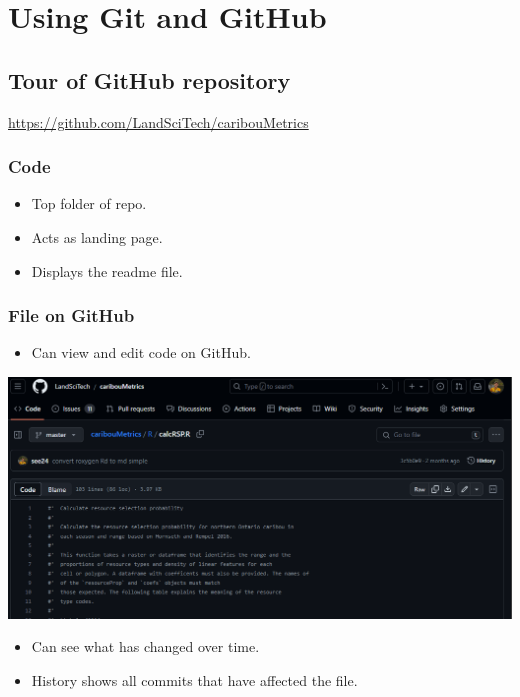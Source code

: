 \documentclass[
  letterpaper,
  DIV=11,
  numbers=noendperiod]{scrreprt}
\providecommand{\tightlist}{%
  \setlength{\itemsep}{0pt}\setlength{\parskip}{0pt}}\usepackage{longtable,booktabs,array}
\begin{document}
\hypertarget{using-git-and-github}{%
\chapter{Using Git and GitHub}\label{using-git-and-github}}

\hypertarget{tour-of-github-repository}{%
\section{Tour of GitHub repository}\label{tour-of-github-repository}}

\url{https://github.com/LandSciTech/caribouMetrics}

\hypertarget{code}{%
\subsection{Code}\label{code}}

\begin{itemize}
\tightlist
\item
  Top folder of repo.
\item
  Acts as landing page.
\item
  Displays the readme file.
\end{itemize}

\hypertarget{file-on-github}{%
\subsection{File on GitHub}\label{file-on-github}}

\begin{itemize}
\tightlist
\item
  Can view and edit code on GitHub.
\end{itemize}

\includegraphics{assets/img/file.png}

\begin{itemize}
\tightlist
\item
  Can see what has changed over time.
\item
  History shows all commits that have affected the file.
\end{itemize}
\end{document}
